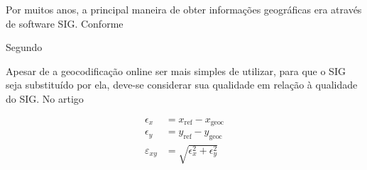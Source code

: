 Por muitos anos, a principal maneira de obter informações geográficas era através de software SIG. Conforme %

Segundo %

Apesar de a geocodificação online ser mais simples de utilizar, para que o SIG seja substituído por ela, deve-se considerar sua qualidade em relação à qualidade do SIG. No artigo %

\begin{align}
   \epsilon_x &= x_{\text{ref}} - x_{\text{geoc}} \\
   \epsilon_y &= y_{\text{ref}} - y_{\text{geoc}} \\
   \varepsilon_{xy} &= \sqrt{\epsilon_x^2 + \epsilon_y^2}
\end{align}

